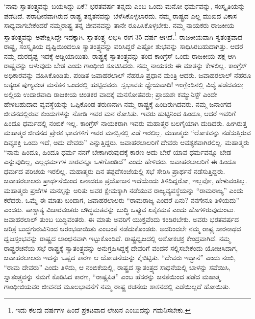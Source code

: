 ‘ನಾವು ಸ್ವಾತಂತ್ರ್ಯವನ್ನು ಬಯಸಿದ್ದು ಏಕೆ? ಭರತವರ್ಷ ತನ್ನದು ಎಂಬ ಒಂದು ಮನೋ ಧರ್ಮವನ್ನು, ಸಂಸ್ಕೃತಿಯನ್ನು ಪಡೆದಿದೆ. ಪರಾಧೀನವಾಗಿರುವ ರಾಷ್ಟ್ರ ತನ್ನತನವನ್ನು ಬೆಳೆಸಿಕೊಳ್ಳಲಾರದು. ನಮ್ಮ ರಾಷ್ಟ್ರದ ಎಲ್ಲ ಮುಖದ ವಿಕಾಸ ಸಾಧ್ಯವಾಗಬೇಕೆಂದರೆ ನಮ್ಮರಾಷ್ಟ್ರ ತನ್ನ ಜೀವನವನ್ನು ತಾನೇ ರೂಪಿಸಿಕೊಳ್ಳಬೇಕು. ನಮ್ಮ ನಾಯಕರು ರಾಜಕೀಯ ಸ್ವಾತಂತ್ರ್ಯವನ್ನು ಅಪೇಕ್ಷಿಸಿದ್ದೇ ಇದಕ್ಕಾಗಿ. ಸ್ವಾತಂತ್ರ್ಯ ಲಭಿಸಿ ಈಗ 35 ವರ್ಷ ಆಗಿದೆ.\footnote{ ಇದು ಕೆಲವು ವರ್ಷಗಳ ಹಿಂದೆ ಪ್ರಕಟವಾದ ಲೇಖನ ಎಂಬುದನ್ನು ಗಮನಿಸಬೇಕು.} ರಾಜಕೀಯವಾಗಿ ಸ್ವತಂತ್ರವಾದ ರಾಷ್ಟ್ರ, ಸಂಸ್ಕೃತಿಯ ದೃಷ್ಟಿಯಿಂದಲೂ ಸ್ವಾತಂತ್ರ್ಯವನ್ನು ವರಿಸಿದ್ದರೆ ಎಷ್ಟೋ ಶುಭವನ್ನು ಸಾಧಿಸಿರಬಹುದಾಗಿತ್ತು. ಆದರೆ ನಮ್ಮ ದುರದೃಷ್ಟ ಇದಕ್ಕೆ ಅಡ್ಡಿಯಾಯಿತು. ರಾಷ್ಟ್ರಕ್ಕೆ ಸ್ವಾತಂತ್ರ್ಯವನ್ನು ತಂದ ಕಾಂಗ್ರೆಸ್ ಒಂದು ರಾಜಕೀಯ ಪಕ್ಷ ಆಗಿ ರಾಷ್ಟ್ರವನ್ನು ಆಳುವುದು ಬೇಡ ಎಂದು ಗಾಂಧೀಜಿ ಸೂಚಿಸಿದರು. ನಮ್ಮ ನಾಯಕರು ಈ ಮಾತನ್ನು ಕೇಳಲಿಲ್ಲ. ಕಾಂಗ್ರೆಸ್ ಅಧಿಕಾರವನ್ನು ವಹಿಸಿಕೊಂಡಿತು. ಪಂಡಿತ ಜವಾಹರಲಾಲ್ ನೆಹರೂ ಪ್ರಧಾನ ಮಂತ್ರಿ ಆದರು. ಜವಾಹರಲಾಲ್ ನೆಹರೂ ಅತ್ಯಂತ ಪುಣ್ಯವಂತ ಮನೆತನ ಒಂದರಲ್ಲಿ ಹುಟ್ಟಿದವರು. ಸ್ವಭಾವತಃ ಧ್ಯೇಯವಾದಿ! ಇಂಗ್ಲೆಂಡಿನಲ್ಲಿ ವಿದ್ಯೆ ಪಡೆದವರು; ಅಲ್ಲಿಯ ಉದಾರವಾದಿ ರಾಜಕೀಯ ಚಿಂತಕರ ವಾದಕ್ಕೆ ಮನಸೋತವರು; ಪ್ರಾಯಶಃ ಕಮ್ಯುನಿಸ್ಟ್ ಎಂದೇ ಹೇಳಬಹುದಾದ ವ್ಯವಸ್ಥೆಯನ್ನು ಒಪ್ಪಿಕೊಂಡ ತರುಣನಾಗಿ ನಮ್ಮ ರಾಷ್ಟ್ರಕ್ಕೆ ಹಿಂದಿರುಗಿದವರು. ನಮ್ಮ ಜನಾಂಗದ ಜೀವನದಲ್ಲಿರುವ ಕುಂದುಗಳನ್ನು ನೋಡಿ ಇವರ ಮನ ರೋಸಿತು. ಇವರು ಹುಟ್ಟಿನಿಂದ ಹಿಂದೂ, ಆದರೆ ಇವರಿಗೆ ಹಿಂದೂ ಧರ್ಮದಲ್ಲಿ ನಂಬಿಕೆ ಇಲ್ಲ. ಕಾಂಗ್ರೆಸ್ ನಾಯಕರಾಗಿ ಇವರು ಮಹಾತ್ಮರ ಬಲಗೈಯಾಗಿ ದುಡಿದರು. ಹೀಗಿರುತ್ತ ಮಹಾತ್ಮರ ಜೀವನದ ಪ್ರೇರಕ ಭಾವಗಳಿಗೆ ಇವರ ಮನಸ್ಸಿನಲ್ಲಿ ಎಡೆ ಇರಲಿಲ್ಲ. ಮಹಾತ್ಮರು “ಲೋಕವನ್ನು ನಡೆಸುತ್ತಿರುವ ದಿವ್ಯಶಕ್ತಿ ಒಂದು ಇದೆ, ಅದು ದೇವರು” ಎನ್ನುತ್ತಿದ್ದರು. ಜವಾಹರಲಾಲರಿಗೆ ದೇವರು ಆವಶ್ಯಕವಾಗಿರಲಿಲ್ಲ. ಮಹಾತ್ಮರು “ನಾನು ಹಿಂದೂ, ಹಿಂದೂ ಧರ್ಮ ನನಗೆ ಬೇಕಾಗಿರುವುದಕ್ಕೆ ಕಾರಣ ಅದು ಬೇರೆ ಯಾವ ಧರ್ಮವನ್ನೂ ಬೇಡ ಎನ್ನುವುದಿಲ್ಲ, ಎಲ್ಲಧರ್ಮಗಳ ಸಾರವನ್ನೂ ಒಳಗೊಂಡಿದೆ” ಎಂದು ಹೇಳಿದರು. ಜವಾಹರಲಾಲರಿಗೆ ಈ ಹಿಂದೂ ಧರ್ಮದ ಪರಿಚಯ ಇರಲಿಲ್ಲ. ಮಹಾತ್ಮರು ದಿನ ತಪ್ಪದೆ\break ಸಂಜೆಯಲ್ಲಿ ಸಭೆ ಸೇರಿಸಿ ಪ್ರಾರ್ಥನೆ ನಡೆಸುತ್ತಿದ್ದರು. ಜವಾಹರಲಾಲರು ಪ್ರಾರ್ಥನೆಯಿಂದ ಏನಾದರೂ ಪ್ರಯೋಜನ ಇದೆಯೆಂದು ತಿಳಿದಿದ್ದರೋ, ಇಲ್ಲವೋ, ಹೇಳುವಂತಿಲ್ಲ. ಮಹಾತ್ಮರು ಪ್ರಜೆಗಳ ಮನಸ್ಸನ್ನು ಅರಿತು ಅವರ ಕ್ಷೇಮಕ್ಕಾಗಿ ನಡೆಯುವ ರಾಜ್ಯವ್ಯವಸ್ಥೆಯನ್ನು “ರಾಮರಾಜ್ಯ” ಎಂದು ಕರೆದರು. ಒಮ್ಮೆ ಈ ಮಾತು ಬಂದಾಗ, ಜವಾಹರಲಾಲರು “ರಾಮರಾಜ್ಯ ಎಂದರೆ ಏನು? ನನಗೇನೂ ತಿಳಿಯದು” ಎಂದರು. ಪಾಶ್ಚಾತ್ಯ ವಿಚಾರವಂತರು ಬೌದ್ಧಮತವನ್ನು ಬುದ್ಧಿ ಒಪ್ಪುವ ಏಕೈಕಮತ ಎಂದು ಹೊಗಳಿರುವುದುಂಟು. ಜವಾಹರಲಾಲ್ ತುಂಬ ಬುದ್ಧಿವಂತರು. ಈ ಮಾತು ಅವರಿಗೆ ಯುಕ್ತವೆಂದು ಕಂಡಿರಬೇಕು. ಅವರು ಭರತವರ್ಷದ ಚರಿತ್ರೆ ಬುದ್ಧಗುರುವಿನಿಂದ ಆರಂಭ\-ವಾಯಿತು ಎಂಬಂತೆ ನಡೆದುಕೊಂಡರು. ಅದರಿಂದಲೇ ನಮ್ಮ ರಾಷ್ಟ್ರ ಸಾರನಾಥದ ಧ್ವಜಸ್ತಂಭವನ್ನು ರಾಷ್ಟ್ರದ ಲಾಂಛನವಾಗಿ ಇಟ್ಟುಕೊಂಡಿದೆ. ರಾಷ್ಟ್ರಧ್ವಜದಲ್ಲಿ ಅಶೋಕಚಕ್ರ ಕೇಂದ್ರವಾಗಿದೆ. ನಮ್ಮ ರಾಷ್ಟ್ರರಚನೆಯ ಸಭೆ ರಾಷ್ಟ್ರಕ್ಕೆ ಸ್ವಾತಂತ್ರ್ಯವನ್ನು ಅನುಗ್ರಹಿಸಿದ್ದಕ್ಕೆ ದೇವರಿಗೆ ವಂದನೆ ಸಲ್ಲಿಸಬೇಕೆಂದು ಯೋಚಿಸಿದಾಗ, ಜವಾಹರಲಾಲರು ಇದನ್ನು ಒಪ್ಪದ ಕಾರಣ ಆ ಯೋಚನೆಯನ್ನು ಕೈಬಿಟ್ಟಿತು. “ದೇವರು ಇದ್ದಾನೆ” ಎಂದು ನಂಬಿ, “ರಾಮ ದೇವರು” ಎಂದು ತಿಳಿದು, ಆ ನಂಬಿಕೆಯಲ್ಲಿ, ರಾಷ್ಟ್ರದ ಸ್ವಾತಂತ್ರ್ಯದ ಸಾಧನೆಯಲ್ಲಿ ಬಾಳನ್ನು ಸವೆಯಿಸಿ, ಸ್ವಾತಂತ್ರ್ಯವನ್ನು ನಮಗೆ ಕೊಡಿಸಿದ ಕಾರಣ, “ರಾಷ್ಟ್ರಪಿತ” ಎಂಬ ಹೆಸರನ್ನು ಜನತೆಯಿಂದ ಪಡೆದ ಮಹಾತ್ಮ ಗಾಂಧೀಜಿಯವರ ಜೀವನದ ಮೂಲಭಾವನೆಗೆ ನಮ್ಮ ರಾಷ್ಟ್ರ ರಚನೆಯ ಶಾಸನದಲ್ಲಿ ಎಡೆಯಿಲ್ಲದೆ ಹೋಯಿತು.

